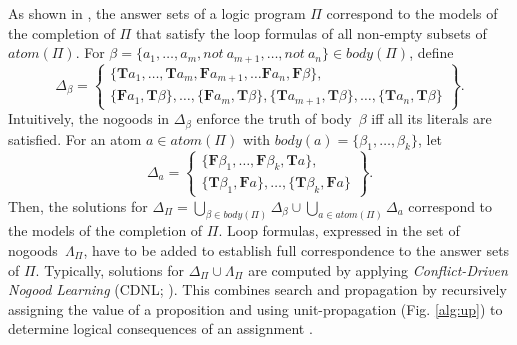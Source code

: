 \documentclass{tlp}
\newcommand{\tass}[1]{\mathbf{T}#1}
\newcommand{\fass}[1]{\mathbf{F}#1}
\newcommand{\atom}[1]{atom(#1)}
\newcommand{\body}[1]{body(#1)}
\newcommand{\dneg}{not\ }
\begin{document}
As shown in , the answer sets of a logic program $\Pi$ correspond to the models of the completion of $\Pi$ that satisfy the loop formulas of all non-empty subsets of $\atom{\Pi}$. For $\beta = \{ a_1 , \dots , a_m, \dneg a_{m+1} , \dots , \dneg a_n \} \in \body{\Pi}$, define
\[
\Delta_\beta = \left\{ \begin{array}{l}
\{\tass{a_1}, \dots, \tass{a_m}, \fass{a_{m+1}}, \dots \fass{a_n}, \fass{\beta} \}, \\
\{\fass{a_1}, \tass{\beta}\}, \dots, \{\fass{a_m}, \tass{\beta}\}, \{\tass{a_{m+1}}, \tass{\beta}\}, \dots, \{\tass{a_n}, \tass{\beta}\}
\end{array} \right\}.
\]
Intuitively, the nogoods in $\Delta_\beta$ enforce the truth of body~$\beta$ iff all its literals are satisfied.
For an atom $a \in \atom{\Pi}$ with $\body{a} = \{\beta_1, \dots, \beta_k\}$, let
\[
\Delta_a = \left\{ \begin{array}{l}
\{\fass{\beta_1}, \dots, \fass{\beta_k}, \tass{a} \}, \\
\{\tass{\beta_1}, \fass{a}\}, \dots, \{\tass{\beta_k}, \fass{a}\}
\end{array} \right\}.
\]
Then, the solutions for $\Delta_\Pi = \bigcup_{\beta \in \body{\Pi}} \Delta_\beta \cup \bigcup_{a \in \atom{\Pi}} \Delta_a$ correspond to the models of the completion of $\Pi$. Loop formulas, expressed in the set of nogoods~$\Lambda_\Pi$, have to be added to establish full correspondence to the answer sets of $\Pi$.
Typically, solutions for $\Delta_\Pi \cup \Lambda_\Pi$ are computed by applying \emph{Conflict-Driven Nogood Learning} (CDNL; ). This combines search and propagation by recursively assigning the value of a proposition and using unit-propagation (Fig. \ref{alg:up}) to determine logical consequences of an assignment \cite{mitchell05a}.
\end{document}

